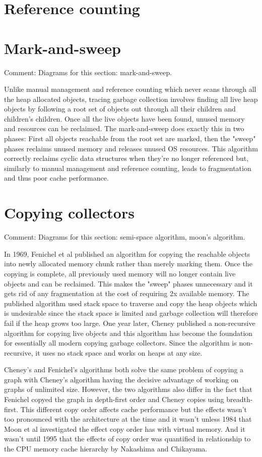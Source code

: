 \documentclass[a4paper,oneside]{memoir}
\newcommand{\makecomment}[1]{{\color{red} Comment: #1}}
\begin{document}
\section{Reference counting}
\section{Mark-and-sweep}
\makecomment{Diagrams for this section: mark-and-sweep.}

Unlike manual management and reference counting which never scans through all
the heap allocated objects, tracing garbage collection involves finding all live
heap objects by following a root set of objects out through all their children
and children's children. Once all the live objects have been found, unused memory
and resources can be reclaimed.
The mark-and-sweep does exactly this in two phases: First all objects reachable
from the root set are marked, then the "sweep" phases reclaims unused memory and
releases unused OS resources.
This algorithm correctly reclaims cyclic data structures when they're no longer
referenced but, similarly to manual management and reference counting, leads to
fragmentation and thus poor cache performance.

\section{Copying collectors}
\makecomment{Diagrams for this section: semi-space algorithm, moon's algorithm.}

In 1969, Fenichel et al published an algorithm for copying the reachable objects
into newly allocated memory chunk rather than merely marking them. Once the copying
is complete, all previously used memory will no longer contain live objects
and can be reclaimed. This makes the "sweep" phases unnecessary and it gets rid
of any fragmentation at the cost of requiring 2x available memory. The published
algorithm used stack space to traverse and copy the heap objects which is
undesirable since the stack space is limited and garbage collection will therefore
fail if the heap grows too large. One year later, Cheney published a non-recursive
algorithm for copying live objects and this algorithm has become the foundation
for essentially all modern copying garbage collectors. Since the algorithm is
non-recursive, it uses no stack space and works on heaps at any size.

Cheney's and Fenichel's algorithms both solve the same problem of copying a graph
with Cheney's algorithm having the decisive advantage of working on graphs of
unlimited size. However, the two algorithms also differ in the fact that Fenichel
copyed the graph in depth-first order and Cheney copies using breadth-first. This
different copy order affects cache performance but the effects wasn't too pronounced
with the architecture at the time and it wasn't unless 1984 that Moon et al
investigated the effect copy order has with virtual memory. And it wasn't until
1995 that the effects of copy order was quantified in relationship to the
CPU memory cache hierarchy by Nakashima and Chikayama.
\end{document}
